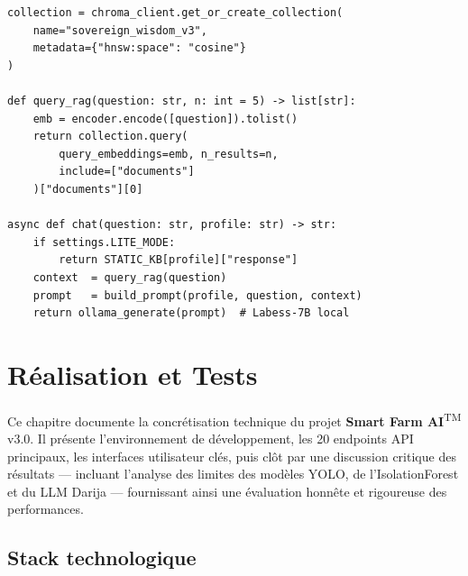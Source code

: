 \documentclass[12pt,a4paper,oneside]{report}
\newcommand{\farmAI}{\textbf{Smart Farm AI}\textsuperscript{TM}}
\begin{document}
\begin{lstlisting}[style=pythonstyle,caption={Service RAG ChromaDB (extrait)},label={lst:rag}]
collection = chroma_client.get_or_create_collection(
    name="sovereign_wisdom_v3",
    metadata={"hnsw:space": "cosine"}
)

def query_rag(question: str, n: int = 5) -> list[str]:
    emb = encoder.encode([question]).tolist()
    return collection.query(
        query_embeddings=emb, n_results=n,
        include=["documents"]
    )["documents"][0]

async def chat(question: str, profile: str) -> str:
    if settings.LITE_MODE:
        return STATIC_KB[profile]["response"]
    context  = query_rag(question)
    prompt   = build_prompt(profile, question, context)
    return ollama_generate(prompt)  # Labess-7B local
\end{lstlisting}

\chapter{Réalisation et Tests}

\noindent Ce chapitre documente la concrétisation technique du projet \farmAI{} v3.0.
Il présente l'environnement de développement, les 20 endpoints API principaux, les
interfaces utilisateur clés, puis clôt par une discussion critique des résultats
— incluant l'analyse des limites des modèles YOLO, de l'IsolationForest et du LLM
Darija — fournissant ainsi une évaluation honnête et rigoureuse des performances.

\section{Stack technologique}
\end{document}
